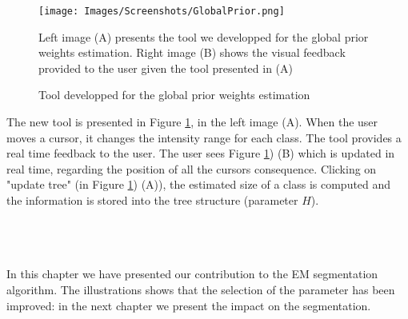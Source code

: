 %
%
%
%
%
%
%


  \begin{figure}\centering
  \texttt{[image: Images/Screenshots/GlobalPrior.png]}
  \caption{Tool developped for the global prior weights estimation}{Left image (A) presents the tool we developped for the global prior weights estimation. Right image (B) shows the visual feedback provided to the user given the tool presented in (A)}\label{fig:globalpriors}
  \end{figure}

The new tool is presented in Figure \ref{fig:globalpriors}, in the left image (A). When the user moves a cursor, it changes the intensity range for each class. The tool provides a real time feedback to the user. The user sees Figure \ref{fig:globalpriors}) (B) which is updated in real time, regarding the position of all the cursors consequence. Clicking on "update tree" (in Figure \ref{fig:globalpriors}) (A)), the estimated size of a class is computed and the information is stored into the tree structure (parameter $H$).\\ \\ \\ \\
\par
In this chapter we have presented our contribution to the EM segmentation algorithm. The illustrations shows that the selection of the parameter has been improved: in the next chapter we present the impact on the segmentation.

